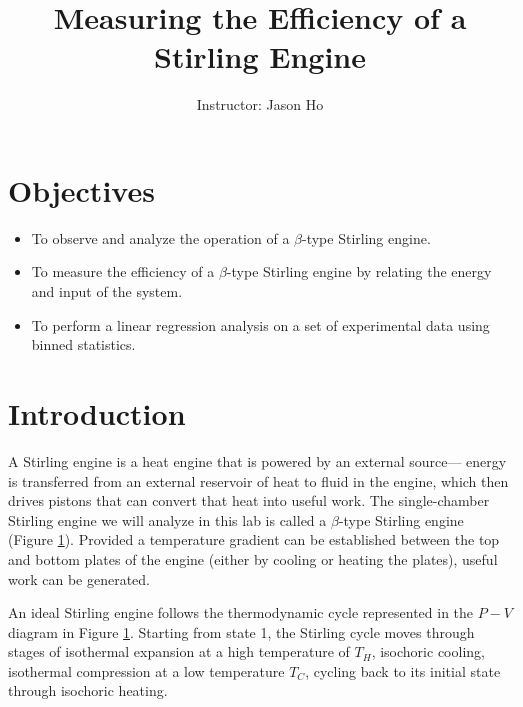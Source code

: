 \documentclass{article}
\title{Measuring the Efficiency of a Stirling Engine}
\author{Instructor: Jason Ho}
\begin{document}
\maketitle
\section*{Objectives}
\begin{itemize}
    \item To observe and analyze the operation of a $\beta$-type Stirling engine.
    \item To measure the efficiency of a $\beta$-type Stirling engine by relating the energy and input of the system.
    \item To perform a linear regression analysis on a set of experimental data using binned statistics.
\end{itemize}
\section{Introduction}
A Stirling engine is a heat engine that is powered by an external source--- energy is transferred from an external reservoir of heat to fluid in the engine, which then drives pistons that can convert that heat into useful work. The single-chamber Stirling engine we will analyze in this lab is called a $\beta$-type Stirling engine (Figure \ref{}). Provided a temperature gradient can be established between the top and bottom plates of the engine (either by cooling or heating the plates), useful work can be generated.

An ideal Stirling engine follows the thermodynamic cycle represented in the $P-V$ diagram in Figure \ref{}. Starting from state 1, the Stirling cycle moves through stages of isothermal expansion at a high temperature of $T_H$, isochoric cooling, isothermal compression at a low temperature $T_C$, cycling back to its initial state through isochoric heating. 
\end{document}
